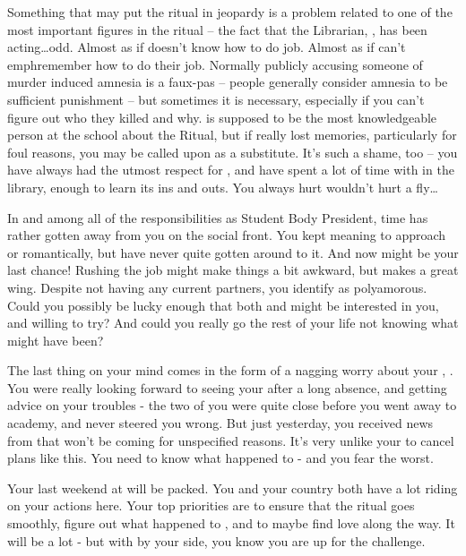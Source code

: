 \documentclass[char]{GL2020}
\begin{document}
Something that may put the ritual in jeopardy is a problem related to one of the most important figures in the ritual -- the fact that the Librarian, \cLibrarian{}, has been acting\ldots odd. Almost as if \cLibrarian{\they} doesn’t know how to do \cLibrarian{\their} job. Almost as if \cLibrarian{\they} can't emph{remember} how to do their job. Normally publicly accusing someone of murder induced amnesia is a faux-pas -- people generally consider amnesia to be sufficient punishment -- but sometimes it is necessary, especially if you can't figure out who they killed and why. \cLibrarian{} is supposed to be the most knowledgeable person at the school about the Ritual, but if \cLibrarian{\they} really \cLibrarian{\have} lost \cLibrarian{\their} memories, particularly for foul reasons, you may be called upon as a substitute. It’s such a shame, too -- you have always had the utmost respect for \cLibrarian{}, and have spent a lot of time with \cLibrarian{\them} in the library, enough to learn its ins and outs. You always hurt \cLibrarian{\they} wouldn’t hurt a fly\ldots

In and among all of the responsibilities as Student Body President, time has rather gotten away from you on the social front. You kept meaning to approach \cHeir{} or \cChupStudent{} romantically, but have never quite gotten around to it. And now might be your last chance! Rushing the job might make things a bit awkward, but \cInitiate{} makes a great wing\cInitiate{\person}. Despite not having any current partners, you identify as polyamorous. Could you possibly be lucky enough that both \cHeir{} and \cChupStudent{} might be interested in you, and willing to try? And could you really go the rest of your life not knowing what might have been?

The last thing on your mind comes in the form of a nagging worry about your \cHeadDiplomat{\auncle}, \cHeadDiplomat{}. You were really looking forward to seeing your \cHeadDiplomat{\auncle} after a long absence, and getting \cHeadDiplomat{\their} advice on your troubles - the two of you were quite close before you went away to academy, and \cHeadDiplomat{\they} never steered you wrong. But just yesterday, you received news from \cEbbPriest{} that \cHeadDiplomat{} won't be coming for unspecified reasons. It’s very unlike your \cHeadDiplomat{\auncle} to cancel plans like this. You need to know what happened to \cHeadDiplomat{\them} - and you fear the worst.

Your last weekend at \pSchool{} will be packed. You and your country both have a lot riding on your actions here. Your top priorities are to ensure that the ritual goes smoothly, figure out what happened to \cHeadDiplomat{\Auncle} \cHeadDiplomat{}, and to maybe find love along the way. It will be a lot - but with \cInitiate{} by your side, you know you are up for the challenge.
\end{document}
